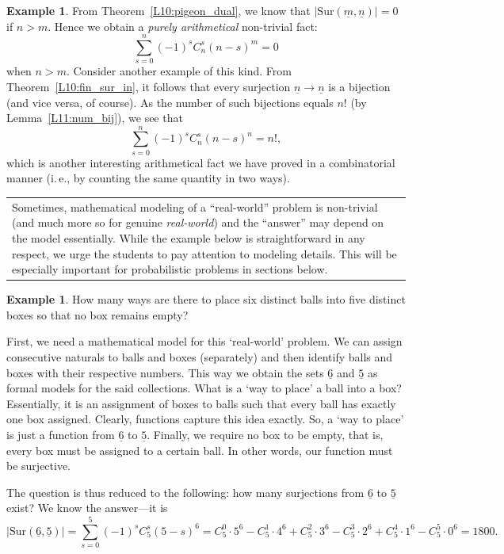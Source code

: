 \documentclass[12pt,notitlepage]{article}
\theoremstyle{plain}
\theoremstyle{definition}
\newtheorem{exm}[thm]{Example}
\theoremstyle{plain}
\newcommand{\ul}[1]{\underline{#1}}
\newcommand{\1}{\mathbf{1}}
\newcommand{\0}{\mathbf{0}}
\newcommand{\mcomm}[1]{
\medskip\noindent\begin{tabular}{| l}
\parbox{0.99\textwidth}{{\small
#1 }}\end{tabular}
\smallskip}
\begin{document}
\begin{exm}
From Theorem~\ref{L10:pigeon_dual}, we know that $|\mathrm{Sur}(\ul{m}, \ul{n})| = 0$ if $n > m$. Hence we obtain a \emph{purely arithmetical} non-trivial fact:
$$\sum\limits_{s = 0}^{n} (-1)^{s} C_n^s (n-s)^m = 0$$
when $n > m$. Consider another example of this kind. From Theorem~\ref{L10:fin_sur_in}, it follows that every surjection $\ul{n} \to \ul{n}$ is a bijection (and vice versa, of course). As the number of such bijections equals $n!$ (by Lemma~\ref{L11:num_bij}), we see that
$$\sum\limits_{s = 0}^{n} (-1)^{s} C_n^s (n-s)^n = n!,$$
which is another interesting arithmetical fact we have proved in a combinatorial manner (i.\,e., by counting the same quantity in two ways).
\end{exm}

\mcomm{Sometimes, mathematical modeling of a ``real-world'' problem is non-trivial (and much more so for genuine \emph{real-world}) and the ``answer'' may depend on the model essentially. While the example below is straightforward in any respect, we urge the students to pay attention to modeling details. This will be especially important for probabilistic problems in  sections below.}

\begin{exm}
How many ways are there to place six distinct balls into five distinct boxes so that no box remains empty?

First, we need a mathematical model for this `real-world' problem. We can assign consecutive naturals to balls and boxes (separately) and then identify balls and boxes with their respective numbers. This way we obtain the sets $\ul{6}$ and $\ul{5}$ as formal models for the said collections. What is a `way to place' a ball into a box? Essentially, it is an assignment of boxes to balls such that every ball has exactly one box assigned. Clearly, functions capture this idea exactly. So, a `way to place' is just a function from $\ul{6}$ to $\ul{5}$. Finally, we require no box to be empty, that is, every box must be assigned to a certain ball. In other words, our function must be surjective.

The question is thus reduced to the following: how many surjections from $\ul{6}$ to $\ul{5}$ exist? We know the answer---it is
$$|\mathrm{Sur}(\ul{6}, \ul{5})| = \sum\limits_{s = 0}^{5} (-1)^{s} C_5^s (5-s)^6 = C_5^0 \cdot 5^6 - C_5^1 \cdot 4^6 + C_5^2 \cdot 3^6 - C_5^3 \cdot 2^6 + C_5^4 \cdot 1^6 - C_5^5 \cdot 0^6 = 1800.$$

\end{exm}
\end{document}
